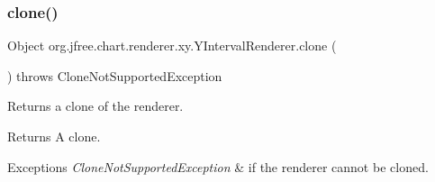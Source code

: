 \subsubsection{\texorpdfstring{clone()}{clone()}}
{\footnotesize\ttfamily Object org.\+jfree.\+chart.\+renderer.\+xy.\+Y\+Interval\+Renderer.\+clone (\begin{DoxyParamCaption}{ }\end{DoxyParamCaption}) throws Clone\+Not\+Supported\+Exception}

Returns a clone of the renderer.

\begin{DoxyReturn}{Returns}
A clone.
\end{DoxyReturn}

\begin{DoxyExceptions}{Exceptions}
{\em Clone\+Not\+Supported\+Exception} & if the renderer cannot be cloned. \\
\hline
\end{DoxyExceptions}
\mbox{\label{classorg_1_1jfree_1_1chart_1_1renderer_1_1xy_1_1_y_interval_renderer_a43d466c38e50d11a599186e4e3b569c1}} 
